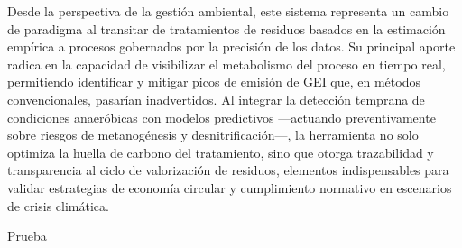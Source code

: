 Desde la perspectiva de la gestión ambiental, este sistema representa un cambio de paradigma al transitar de tratamientos de residuos basados en la estimación empírica a procesos gobernados por la precisión de los datos. Su principal aporte radica en la capacidad de visibilizar el metabolismo del proceso en tiempo real, permitiendo identificar y mitigar picos de emisión de GEI que, en métodos convencionales, pasarían inadvertidos. Al integrar la detección temprana de condiciones anaeróbicas con modelos predictivos —actuando preventivamente sobre riesgos de metanogénesis y desnitrificación—, la herramienta no solo optimiza la huella de carbono del tratamiento, sino que otorga trazabilidad y transparencia al ciclo de valorización de residuos, elementos indispensables para validar estrategias de economía circular y cumplimiento normativo en escenarios de crisis climática.

Prueba \textcite{larisaWastetofeedBioconversionUsing2025a}